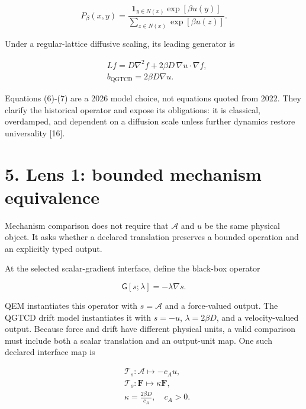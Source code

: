 \documentclass[
  american,
  11pt,
  letterpaper,
]{article}
\begin{document}
\begin{equation}
P_\beta(x,y)=
\frac{\mathbf{1}_{y\in N(x)}\exp[\beta u(y)]}
{\sum_{z\in N(x)}\exp[\beta u(z)]}.
\tag{6}
\end{equation}

Under a regular-lattice diffusive scaling, its leading generator is

\begin{equation}
\begin{aligned}
& L f=D\nabla^2 f+2\beta D\,\nabla u\cdot\nabla f, \\
& b_{\mathrm{QGTCD}}=2\beta D\nabla u.
\end{aligned}
\tag{7}
\end{equation}

Equations (6)-(7) are a 2026 model choice, not equations quoted from 2022. They clarify the historical operator and expose its obligations: it is classical, overdamped, and dependent on a diffusion scale unless further dynamics restore universality {[}16{]}.

\section{5. Lens 1: bounded mechanism equivalence}\label{lens-1-bounded-mechanism-equivalence}

Mechanism comparison does not require that \(\mathcal{A}\) and \(u\) be the same physical object. It asks whether a declared translation preserves a bounded operation and an explicitly typed output.

At the selected scalar-gradient interface, define the black-box operator

\begin{equation}
\mathsf{G}[s;\lambda]=-\lambda\nabla s.
\tag{8}
\end{equation}

QEM instantiates this operator with \(s=\mathcal{A}\) and a force-valued output. The QGTCD drift model instantiates it with \(s=-u\), \(\lambda=2\beta D\), and a velocity-valued output. Because force and drift have different physical units, a valid comparison must include both a scalar translation and an output-unit map. One such declared interface map is

\begin{equation}
\begin{aligned}
& \mathcal{T}_s:\mathcal{A}\mapsto-c_Au, \\
& \mathcal{T}_o:\mathbf{F}\mapsto\kappa\mathbf{F}, \\
& \kappa=\frac{2\beta D}{c_A},
\quad c_A>0.
\end{aligned}
\tag{9}
\end{equation}
\end{document}
